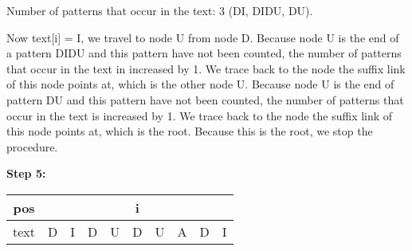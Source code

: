 Number of patterns that occur in the text: 3 (DI, DIDU, DU).

Now text[i] = I, we travel to node U from node D. Because node U is the end of a pattern DIDU and this pattern have not been counted, the number of patterns that occur in the text in increased by 1. We trace back to the node the suffix link of this node points at, which is the other node U. Because node U is the end of pattern DU and this pattern have not been counted, the number of patterns that occur in the text is increased by 1. We trace back to the node the suffix link of this node points at, which is the root. Because this is the root, we stop the procedure.
\pagebreak

\textbf{Step 5:}
\begin{center}

    \begin{table}[H]
    \centering
    \begin{tabular}{|c|c|c|c|c|c|c|c|c|c|}
    \hline
    pos   &   &   &   &   & i &   &   &   &   \\ \hline
    text  & D & I & D & U & D & U & A & D & I \\ \hline
    \end{tabular}
    \end{table}
    
\end{center}
